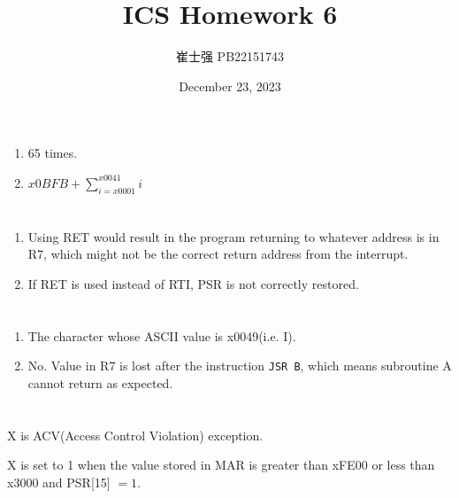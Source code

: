 \documentclass[UTF8]{ctexart}
\title{ICS Homework 6}
\author{崔士强 PB22151743}
\date{December 23, 2023}
\begin{document}
\maketitle

\section{}  %
\begin{enumerate}
  \item 65 times.
  \item $x0BFB + \sum_{i=x0001}^{x0041} i$
\end{enumerate}

\section{}  %
\begin{enumerate}
  \item Using RET would result in the program returning to whatever address is in R7, which might not be the correct return address from the interrupt.
  \item If RET is used instead of RTI, PSR is not correctly restored.
\end{enumerate}

\section{}  %
\begin{enumerate}
  \item The character whose ASCII value is x0049(i.e. I).
  \item No. Value in R7 is lost after the instruction \lstinline{JSR B}, which means subroutine A cannot return as expected.
\end{enumerate}

\section{}  %
X is ACV(Access Control Violation) exception.

X is set to 1 when the value stored in MAR is greater than xFE00 or less than x3000 and PSR[15] $= 1$.
\end{document}
